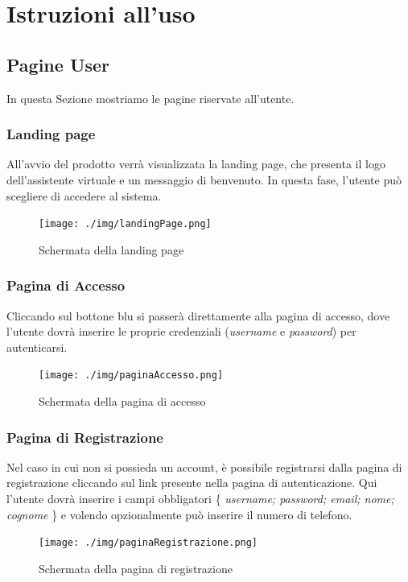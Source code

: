 \section{Istruzioni all'uso}
\subsection{Pagine User}
In questa Sezione mostriamo le pagine riservate all'utente.
\subsubsection{Landing page}
All'avvio del prodotto verrà visualizzata la landing page, che presenta il logo dell'assistente virtuale e un messaggio di benvenuto. In questa fase, l'utente può scegliere di accedere al sistema.
\begin{figure}[h!]
    \centering
    \texttt{[image: ./img/landingPage.png]}
    \caption{Schermata della landing page}
\end{figure}

\subsubsection{Pagina di Accesso}
Cliccando sul bottone blu si passerà direttamente alla pagina di accesso, dove l'utente dovrà inserire le proprie credenziali (\textit{username} e \textit{password}) per autenticarsi.
\begin{figure}[h!]
    \centering
    \texttt{[image: ./img/paginaAccesso.png]}
    \caption{Schermata della pagina di accesso}
\end{figure}

\subsubsection{Pagina di Registrazione}
Nel caso in cui non si possieda un account, è possibile registrarsi dalla pagina di registrazione cliccando sul link presente nella pagina di autenticazione.
Qui l'utente dovrà inserire i campi obbligatori \{ \textit{username; password; email; nome; cognome} \} e volendo opzionalmente può inserire il numero di telefono.
\begin{figure}[h!]
    \centering
    \texttt{[image: ./img/paginaRegistrazione.png]}
    \caption{Schermata della pagina di registrazione}
\end{figure}

